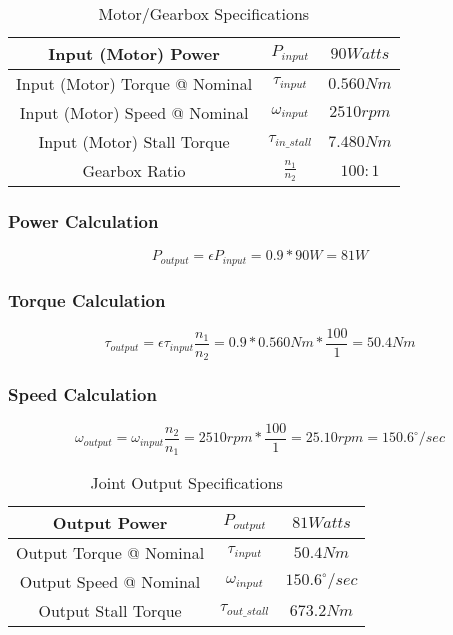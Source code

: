 
\begin{table}[H]
    \centering
    \begin{tabular}{||c|c|c||}
        \hline
        Input (Motor) Power & \(P_{input}\) & \(90 Watts\) \\
        \hline
        Input (Motor) Torque @ Nominal & \(\tau_{input}\) & \(0.560 Nm\) \\
        \hline
        Input (Motor) Speed @ Nominal & \(\omega_{input}\) & \(2510 rpm\) \\
        \hline
        Input (Motor) Stall Torque & \(\tau_{in\_stall}\) & \(7.480 Nm\) \\
        \hline
        Gearbox Ratio & \(\frac{n_1}{n_2}\) & \(100:1\) \\
        \hline
    \end{tabular}
    \caption{Motor/Gearbox Specifications}
    \label{table:ApxMotorGearboxSpecs}
\end{table}

\subsubsection{Power Calculation}
\begin{equation}
    P_{output} = \epsilon P_{input} = 0.9 * 90W = 81W
     \label{eq:PowerCalc}
\end{equation}

\subsubsection{Torque Calculation}
\begin{equation}
    \tau_{output} = \epsilon  \tau_{input} \frac{n_1}{n_2} = 0.9 * 0.560 Nm * \frac{100}{1} = 50.4 Nm
    \label{eq:TorqueCalc}
\end{equation}

\subsubsection{Speed Calculation}
\begin{equation}
    \omega_{output} = \omega_{input}  \frac{n_2}{n_1} = 2510 rpm * \frac{100}{1} = 25.10 rpm = 150.6^\circ/sec
    \label{eq:SpeedCalc}
\end{equation}

\begin{table}[H]
    \centering
    \begin{tabular}{||c|c|c||}
        \hline
        Output Power & \(P_{output}\) & \(81 Watts\) \\
        \hline
        Output Torque @ Nominal & \(\tau_{input}\) & \(50.4 Nm\) \\
        \hline
        Output Speed @ Nominal & \(\omega_{input}\) & \(150.6^\circ/sec\) \\
        \hline
        Output Stall Torque & \(\tau_{out\_stall}\) & \(673.2 Nm\) \\
        \hline
    \end{tabular}
    \caption{Joint Output Specifications}
    \label{table:ApxJointSpecs}
\end{table}